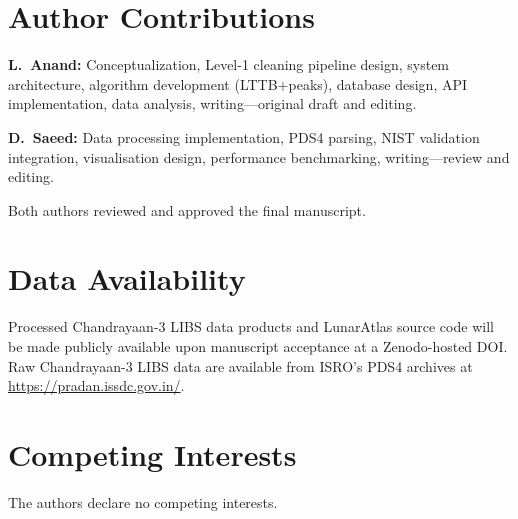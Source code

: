\documentclass[a4paper,twocolumn,10pt]{article}
\begin{document}
\section*{Author Contributions}

\textbf{L.~Anand:} Conceptualization, Level-1 cleaning pipeline
design, system architecture, algorithm development (LTTB+peaks),
database design, API implementation, data analysis,
writing---original draft and editing.

\textbf{D.~Saeed:} Data processing implementation, PDS4 parsing,
NIST validation integration, visualisation design, performance
benchmarking, writing---review and editing.

Both authors reviewed and approved the final manuscript.


\section*{Data Availability}

Processed Chandrayaan-3 LIBS data products and LunarAtlas source code
will be made publicly available upon manuscript acceptance at a
Zenodo-hosted DOI.  Raw Chandrayaan-3 LIBS data are available from
ISRO's PDS4 archives at \url{https://pradan.issdc.gov.in/}.


\section*{Competing Interests}

The authors declare no competing interests.
\end{document}
